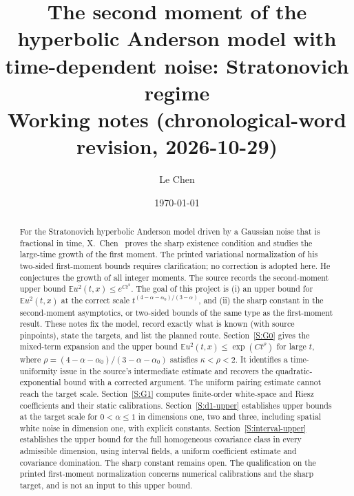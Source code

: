\documentclass[12pt]{article}
\numberwithin{equation}{section}
\theoremstyle{definition}
\newcommand{\E}{\mathbb{E}}
\begin{document}
\title{The second moment of the hyperbolic Anderson model with time-dependent
noise: Stratonovich regime\\[0.3em]
{\normalsize Working notes (chronological-word revision, 2026-10-29)}}
\author{Le Chen}
\date{\today}
\maketitle

\begin{abstract}
  For the Stratonovich hyperbolic Anderson model driven by a Gaussian noise
  that is fractional in time, X.~Chen~\cite{chen:author2026:time-dependency}
  proves the sharp existence condition and studies the large-time growth
  of the first moment. The printed variational normalization of his
  two-sided first-moment bounds requires clarification; no correction is
  adopted here. He conjectures the growth of all integer moments. The source records the second-moment upper bound
  $\E u^2(t,x)\le e^{Ct^2}$. The goal of this project is (i) an upper bound
  for $\E u^2(t,x)$ at the correct scale
  $t^{(4-\alpha-\alpha_0)/(3-\alpha)}$, and (ii) the sharp constant in the
  second-moment asymptotics, or two-sided bounds of the same type as the
  first-moment result. These notes fix the model, record exactly what is
  known (with source pinpoints), state the targets, and list the planned
  route. Section~\ref{S:G0} gives the mixed-term expansion and the upper
  bound $\E u^2(t,x)\le\exp(Ct^\rho)$ for large $t$, where
  $\rho=(4-\alpha-\alpha_0)/(3-\alpha-\alpha_0)$ satisfies
  $\kappa<\rho<2$. It identifies a time-uniformity issue in the source's
  intermediate estimate and recovers the quadratic-exponential bound
  with a corrected argument. The uniform pairing estimate cannot reach
  the target scale. Section~\ref{S:G1} computes finite-order white-space
  and Riesz coefficients and their static calibrations.
  Section~\ref{S:d1-upper} establishes upper bounds at the target
  scale for $0<\alpha\le1$ in dimensions one, two and three, including
  spatial white noise in dimension one, with explicit constants.
  Section~\ref{S:interval-upper} establishes the upper bound for the
  full homogeneous covariance class in every admissible dimension,
  using interval fields, a uniform coefficient estimate and covariance
  domination. The sharp constant remains open. The qualification on the
  printed first-moment normalization concerns numerical calibrations and
  the sharp target, and is not an input to this upper bound.
\end{abstract}
\end{document}
